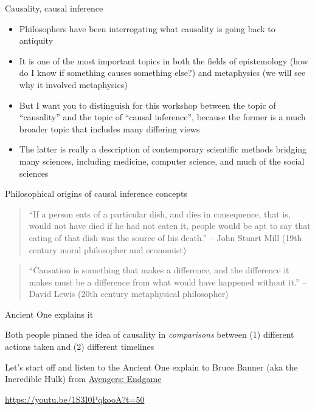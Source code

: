 \documentclass{beamer}
\begin{document}
\begin{frame}{Causality, causal inference}

\begin{itemize}

\item Philosophers have been interrogating what causality is going back to antiquity
\item It is one of the most important topics in both the fields of epistemology (how do I know if something causes something else?) and metaphysics (we will see why it involved metaphysics)
\item But I want you to distinguish for this workshop between the topic of ``causality'' and the topic of ``causal inference'', because the former is a much broader topic that includes many differing views
\item The latter is really a description of contemporary scientific methods bridging many sciences, including medicine, computer science, and much of the social sciences

\end{itemize}

\end{frame}

\begin{frame}{Philosophical origins of causal inference concepts}

  \begin{quote}
    ``If a person eats of a particular dish, and dies in consequence, that is, would not have died if he had not eaten it, people would be apt to say that eating of that dish was the source of his death.'' -- John Stuart Mill (19th century moral philosopher and economist)
  \end{quote}

  \bigskip
  
    \begin{quote}
    ``Causation is something that makes a difference, and the difference it makes must be a difference from what would have happened without it.'' -- David Lewis (20th century metaphysical philosopher)
  \end{quote}

\end{frame}



\begin{frame}{Ancient One explains it}

  Both people pinned the idea of causality in \emph{comparisons} between (1) different actions taken and (2) different timelines
  
  \bigskip
  
  Let's start off and listen to the Ancient One explain to Bruce Banner (aka the Incredible Hulk) from \underline{Avengers: Endgame}
  
  \bigskip
  
  \url{https://youtu.be/1S3I0PqkooA?t=50}
  
  \end{frame}
  
\end{document}
